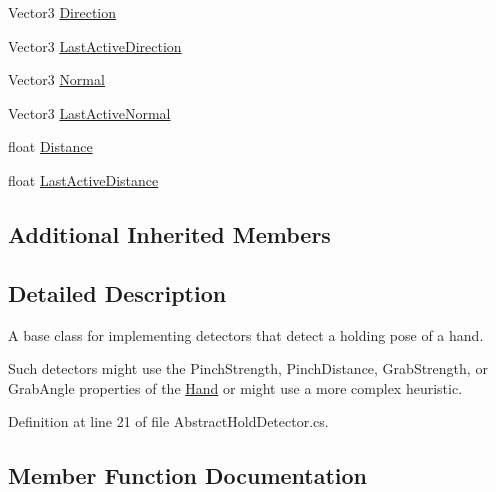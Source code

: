 \begin{DoxyCompactItemize}
\item 
Vector3 \mbox{\hyperlink{class_leap_1_1_unity_1_1_abstract_hold_detector_a848f884394e70077b29151eb0990a01f}{Direction}}
\item 
Vector3 \mbox{\hyperlink{class_leap_1_1_unity_1_1_abstract_hold_detector_aa441439133054464eaccf90f863b66cb}{Last\+Active\+Direction}}
\item 
Vector3 \mbox{\hyperlink{class_leap_1_1_unity_1_1_abstract_hold_detector_ad819cc92c7d07586bbaa70e47541b4d6}{Normal}}
\item 
Vector3 \mbox{\hyperlink{class_leap_1_1_unity_1_1_abstract_hold_detector_ae8d7853529cfcf1e47f60b31969b18de}{Last\+Active\+Normal}}
\item 
float \mbox{\hyperlink{class_leap_1_1_unity_1_1_abstract_hold_detector_a711146086ce3df77ba7476bb2dfd9515}{Distance}}
\item 
float \mbox{\hyperlink{class_leap_1_1_unity_1_1_abstract_hold_detector_af98af3733f75b2a9f9231dd0eb163952}{Last\+Active\+Distance}}
\end{DoxyCompactItemize}
\subsection*{Additional Inherited Members}


\subsection{Detailed Description}
A base class for implementing detectors that detect a holding pose of a hand.

Such detectors might use the Pinch\+Strength, Pinch\+Distance, Grab\+Strength, or Grab\+Angle properties of the \mbox{\hyperlink{class_leap_1_1_hand}{Hand}} or might use a more complex heuristic. 

Definition at line 21 of file Abstract\+Hold\+Detector.\+cs.



\subsection{Member Function Documentation}
\mbox{\label{class_leap_1_1_unity_1_1_abstract_hold_detector_a49f88a2f7de4f6c35309c32bbb69ae2b}} 
